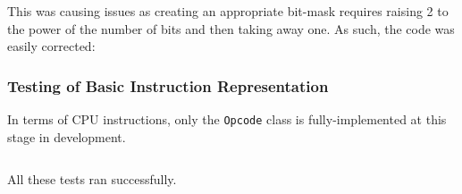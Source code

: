         This was causing issues as creating an appropriate bit-mask requires raising 2 to the power of the number of bits and then taking away one. As such, the code was easily corrected: 


    \subsubsection{Testing of Basic Instruction Representation}
        In terms of CPU instructions, only the \texttt{Opcode} class is fully-implemented at this stage in development.

        \inputminted{c++}{code/second/testinstructions.cpp}

        All these tests ran successfully.
